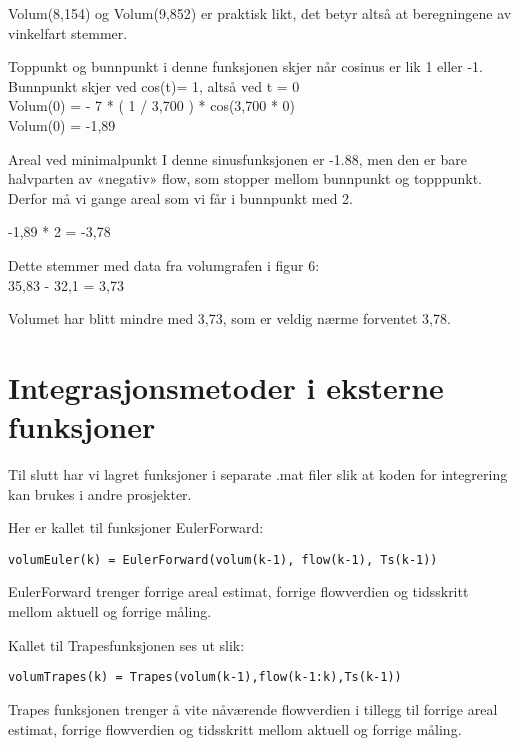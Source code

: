 Volum(8,154) og Volum(9,852) er praktisk likt, det betyr altså at beregningene av vinkelfart stemmer.

Toppunkt og bunnpunkt i denne funksjonen skjer når cosinus er lik 1 eller -1.
Bunnpunkt skjer ved cos(t)= 1, altså ved t = 0 \\
Volum(0) = - 7 * ( 1 / 3,700 ) * cos(3,700 * 0) \\
Volum(0) = -1,89

Areal ved minimalpunkt I denne sinusfunksjonen er -1.88, men den er bare halvparten av «negativ» flow, som stopper mellom bunnpunkt og topppunkt. Derfor må vi gange areal som vi får i bunnpunkt med 2.

\begin{figure}[H]
\centering
\end{figure}

-1,89 * 2 = -3,78

Dette stemmer med data fra volumgrafen i figur 6: \\
35,83 - 32,1 = 3,73

Volumet har blitt mindre med 3,73, som er veldig nærme forventet 3,78.


\section{Integrasjonsmetoder i eksterne funksjoner}

Til slutt har vi lagret funksjoner i separate .mat filer slik at koden for integrering kan brukes i andre prosjekter.

Her er kallet til funksjoner EulerForward:
\begin{lstlisting}
volumEuler(k) = EulerForward(volum(k-1), flow(k-1), Ts(k-1))
\end{lstlisting}

EulerForward trenger forrige areal estimat, forrige flowverdien og tidsskritt mellom aktuell og forrige måling.

Kallet til Trapesfunksjonen ses ut slik: 
\begin{lstlisting}
volumTrapes(k) = Trapes(volum(k-1),flow(k-1:k),Ts(k-1))
\end{lstlisting}

Trapes funksjonen trenger å vite nåværende flowverdien i tillegg til forrige areal estimat, forrige flowverdien og tidsskritt mellom aktuell og forrige måling.


\begin{figure}[H]
\centering
\end{figure}